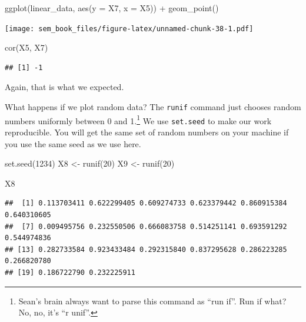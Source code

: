 \documentclass[
]{book}
\newenvironment{Shaded}{\begin{snugshade}}{\end{snugshade}}
\newcommand{\AttributeTok}[1]{\textcolor[rgb]{0.77,0.63,0.00}{#1}}
\newcommand{\DecValTok}[1]{\textcolor[rgb]{0.00,0.00,0.81}{#1}}
\newcommand{\FunctionTok}[1]{\textcolor[rgb]{0.00,0.00,0.00}{#1}}
\newcommand{\NormalTok}[1]{#1}
\newcommand{\OtherTok}[1]{\textcolor[rgb]{0.56,0.35,0.01}{#1}}
\newcommand{\SpecialCharTok}[1]{\textcolor[rgb]{0.00,0.00,0.00}{#1}}
\begin{document}
\begin{Shaded}
\begin{Highlighting}[]
\FunctionTok{ggplot}\NormalTok{(linear\_data, }\FunctionTok{aes}\NormalTok{(}\AttributeTok{y =}\NormalTok{ X7, }\AttributeTok{x =}\NormalTok{ X5)) }\SpecialCharTok{+}
    \FunctionTok{geom\_point}\NormalTok{()}
\end{Highlighting}
\end{Shaded}

\texttt{[image: sem\_book\_files/figure-latex/unnamed-chunk-38-1.pdf]}

\begin{Shaded}
\begin{Highlighting}[]
\FunctionTok{cor}\NormalTok{(X5, X7)}
\end{Highlighting}
\end{Shaded}

\begin{verbatim}
## [1] -1
\end{verbatim}

Again, that is what we expected.

What happens if we plot random data? The \texttt{runif} command just chooses random numbers uniformly between 0 and 1.\footnote{Sean's brain always want to parse this command as ``run if''. Run if what? No, no, it's ``r unif''.} We use \texttt{set.seed} to make our work reproducible. You will get the same set of random numbers on your machine if you use the same seed as we use here.

\begin{Shaded}
\begin{Highlighting}[]
\FunctionTok{set.seed}\NormalTok{(}\DecValTok{1234}\NormalTok{)}
\NormalTok{X8 }\OtherTok{\textless{}{-}} \FunctionTok{runif}\NormalTok{(}\DecValTok{20}\NormalTok{)}
\NormalTok{X9 }\OtherTok{\textless{}{-}} \FunctionTok{runif}\NormalTok{(}\DecValTok{20}\NormalTok{)}
\end{Highlighting}
\end{Shaded}

\begin{Shaded}
\begin{Highlighting}[]
\NormalTok{X8}
\end{Highlighting}
\end{Shaded}

\begin{verbatim}
##  [1] 0.113703411 0.622299405 0.609274733 0.623379442 0.860915384 0.640310605
##  [7] 0.009495756 0.232550506 0.666083758 0.514251141 0.693591292 0.544974836
## [13] 0.282733584 0.923433484 0.292315840 0.837295628 0.286223285 0.266820780
## [19] 0.186722790 0.232225911
\end{verbatim}
\end{document}
